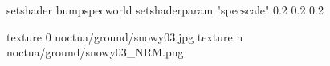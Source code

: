 setshader bumpspecworld
setshaderparam "specscale" 0.2 0.2 0.2

texture 0 noctua/ground/snowy03.jpg
texture n noctua/ground/snowy03_NRM.png
